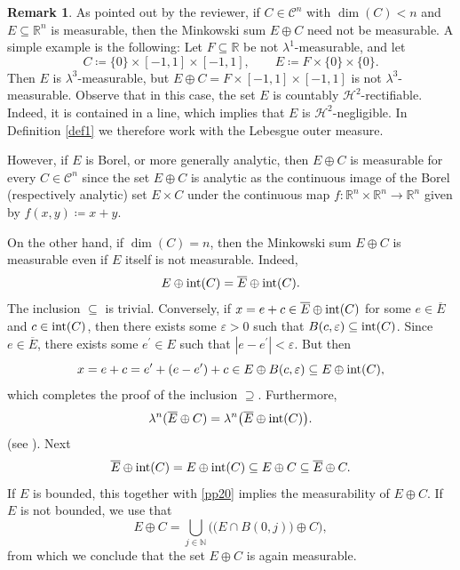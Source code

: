 \documentclass[pdflatex,sn-mathphys-num]{sn-jnl}
\theoremstyle{plain}
\theoremstyle{definition}
\newtheorem{rem}[theorem]{Remark}
\DeclareMathOperator{\inter}{\textup{int}}
\begin{document}
\begin{rem}\label{measurability}
As pointed out by the reviewer, if $C\in\mathcal{C}^n$ with $\dim(C)<n$ and $E\subseteq\mathbb{R}^n$ is measurable, then the Minkowski sum $E\oplus C$ need not be measurable. A simple example is the following: Let $F\subseteq\mathbb{R}$ be not $\lambda^1$-measurable, and let $$C\coloneqq \{0\}\times [-1, 1]\times [-1, 1], \qquad E\coloneqq F\times\{0\}\times\{0\}.$$ Then $E$ is $\lambda^3$-measurable, but $E\oplus C=F\times[-1, 1]\times [-1, 1]$ is not $\lambda^3$-measurable. Observe that in this case, the set $E$ is countably $\mathcal{H}^2$-rectifiable. Indeed, it is contained in a line, which implies that $E$ is $\mathcal{H}^2$-negligible. In Definition \ref{def1} we therefore work with the Lebesgue outer measure.

However, if $E$ is Borel, or more generally analytic, then $E\oplus C$ is measurable for every $C\in\mathcal{C}^n$ since the set $E\oplus C$ is analytic as the continuous image of the Borel (respectively analytic) set $E\times C$ under the continuous map $f\colon \mathbb{R}^n\times \mathbb{R}^n\to\mathbb{R}^n$ given by $f(x, y)\coloneqq x+y.$ 

On the other hand, if $\dim(C)=n$, then the Minkowski sum $E\oplus C$ is measurable even if $E$ itself is not measurable. Indeed, $$E\oplus \inter(C)=\overline{E}\oplus\inter(C).$$ The inclusion $\subseteq$ is trivial. Conversely, if $x=e+c\in \overline{E}\oplus\inter(C)$ for some $e\in\overline{E}$ and $c\in\inter(C)$, then there exists some $\varepsilon>0$ such that $B(c, \varepsilon)\subseteq \inter(C)$. Since $e\in\overline{E}$, there exists some $e^{\prime}\in E$ such that $|e-e^{\prime}|<\varepsilon$. But then $$x=e+c=e^{\prime}+(e-e^{\prime})+c\in E\oplus B(c, \varepsilon)\subseteq E\oplus \inter(C),$$ which completes the proof of the inclusion $\supseteq$. Furthermore, \begin{align}\label{pp20}
    \lambda^n(\overline{E}\oplus C)=\lambda^n\big(\overline{E}\oplus\inter(C)\big).
\end{align} (see \cite[p. 6, Eq. (10)]{Rataj5}). Next \begin{align*}
   \overline{E}\oplus\inter(C)=E\oplus \inter(C)\subseteq  E\oplus C\subseteq \overline{E}\oplus C.
\end{align*}
If $E$ is bounded, this together with \eqref{pp20} implies the measurability of $E\oplus C$. If $E$ is not bounded, we use that $$E\oplus C=\bigcup_{j\in\mathbb{N}}\Big(\big(E\cap B(0, j)\big)\oplus C\Big),$$ from which we conclude that the set $E\oplus C$ is again measurable.
\end{rem}
\end{document}
